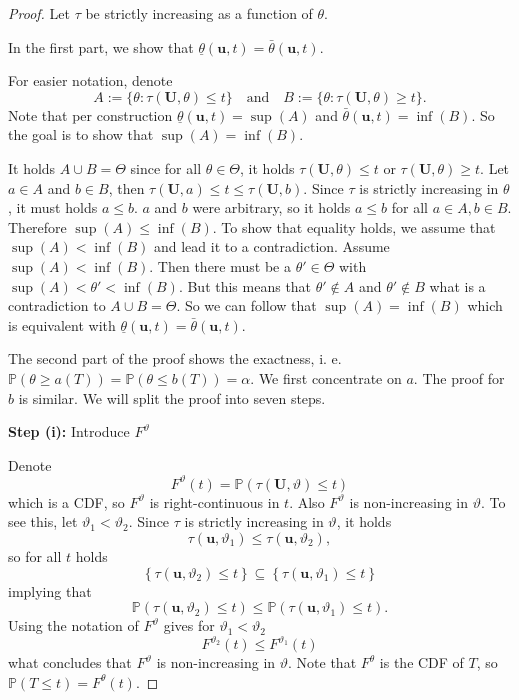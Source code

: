 \begin{proof}
	Let $\tau$ be strictly increasing as a function of $\theta$.
	
	In the first part, we show that $\underline \theta (\mathbf u, t) = \bar \theta (\mathbf u, t)$.
	
	For easier notation, denote 
	\[
		A := \{ \theta: \tau (\mathbf U, \theta) \leq t \} 
		\quad \text{and} \quad
		B := \{ \theta: \tau (\mathbf U, \theta) \geq t \}.
	\]
	Note that per construction $\underline \theta (\mathbf u, t) = \sup (A)$ and $\bar \theta (\mathbf u, t) = \inf (B)$. 
	So the goal is to show that $\sup (A) = \inf (B)$.
	
	It holds $A \cup B = \Theta$ since for all $\theta \in \Theta$, it holds $\tau (\mathbf U, \theta) \leq t$ or $\tau (\mathbf U, \theta) \geq t$. 
	Let $a \in A$ and $b \in B$, then $\tau (\mathbf U, a) \leq t \leq \tau (\mathbf U, b)$. Since $\tau$ is strictly increasing in $\theta$, it must holds $a \leq b$. $a$ and $b$ were arbitrary, so it holds $a \leq b$ for all $a \in A, b \in B$. Therefore $\sup (A) \leq \inf (B)$. To show that equality holds, we assume that $\sup (A) < \inf (B)$ and lead it to a contradiction. Assume $\sup (A) < \inf (B)$. Then there must be a $\theta' \in \Theta$ with $\sup (A) < \theta' < \inf (B)$. But this means that $\theta' \notin A$ and $\theta' \notin B$ what is a contradiction to $A \cup B = \Theta$. 
	So we can follow that $\sup (A) = \inf (B)$ which is equivalent with $\underline \theta (\mathbf u, t) = \bar \theta (\mathbf u, t)$.
	
	The second part of the proof shows the exactness, i. e. $\mathbb{P} \left( \theta \geq a(T) \right) = \mathbb{P} \left( \theta \leq b(T) \right) = \alpha$. 
	We first concentrate on $a$. The proof for $b$ is similar.
	We will split the proof into seven steps.
	
	\textbf{Step (i):} Introduce $F^\vartheta$
	
	Denote 
	\[
	F^{\vartheta}(t) = \mathbb{P} \left( \tau (\mathbf U, \vartheta) \leq t \right)
	\]
	which is a CDF, so $F^{\vartheta}$ is right-continuous in $t$. Also $F^{\vartheta}$ is non-increasing in $\vartheta$. 
	To see this, let $\vartheta_1 < \vartheta_2$. 
	Since $\tau$ is strictly increasing in $\vartheta$, it holds 
	\[
	\tau(\mathbf u, \vartheta_1) \leq \tau(\mathbf u, \vartheta_2), 
	\]
	so for all $t$ holds
	\[
	\left\{ \tau(\mathbf u, \vartheta_2) \leq t \right\} \subseteq 
	\left\{ \tau(\mathbf u, \vartheta_1) \leq t \right\}
	\]
	implying that
	\[
	\mathbb{P} \left( \tau(\mathbf u, \vartheta_2) \leq t \right)
	\leq 
	\mathbb{P} \left( \tau(\mathbf u, \vartheta_1) \leq t \right).
	\]
	Using the notation of $F^{\vartheta}$ gives for $\vartheta_1 < \vartheta_2$  
	\[
	F^{\vartheta_2} (t) \leq F^{\vartheta_1} (t)
	\]
	what concludes that $F^{\vartheta}$ is non-increasing in $\vartheta$.
	Note that $F^\theta$ is the CDF of $T$, so $\mathbb{P} (T \leq t)  = F^\theta (t)$.
	

\end{proof}
